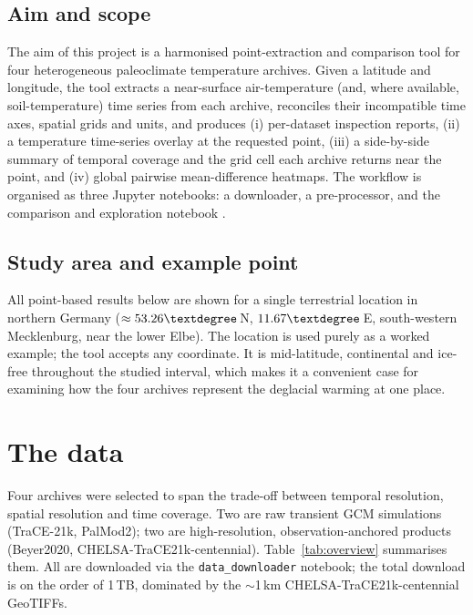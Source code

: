 \documentclass{isprs}
\newcommand{\dg}{\textdegree}
\newcommand{\tabbr}[1]{\texttt{#1}}
\begin{document}
\subsection{Aim and scope}
The aim of this project is a harmonised point-extraction and comparison tool for four heterogeneous paleoclimate temperature archives. Given a latitude and longitude, the tool extracts a near-surface air-temperature (and, where available, soil-temperature) time series from each archive, reconciles their incompatible time axes, spatial grids and units, and produces (i) per-dataset inspection reports, (ii) a temperature time-series overlay at the requested point, (iii) a side-by-side summary of temporal coverage and the grid cell each archive returns near the point, and (iv) global pairwise mean-difference heatmaps. The workflow is organised as three Jupyter notebooks: a downloader, a pre-processor, and the comparison and exploration notebook \cite{giersch2026_paleoclimate_model_comparison}.

\subsection{Study area and example point}
All point-based results below are shown for a single terrestrial location in northern Germany ($\approx 53.26\dg$\,N, $11.67\dg$\,E, south-western Mecklenburg, near the lower Elbe). The location is used purely as a worked example; the tool accepts any coordinate. It is mid-latitude, continental and ice-free throughout the studied interval, which makes it a convenient case for examining how the four archives represent the deglacial warming at one place.

\section{The data}
Four archives were selected to span the trade-off between temporal resolution, spatial resolution and time coverage. Two are raw transient GCM simulations (TraCE-21k, PalMod2); two are high-resolution, observation-anchored products (Beyer2020, CHELSA-TraCE21k-centennial). Table~\ref{tab:overview} summarises them. All are downloaded via the \tabbr{data\_downloader} notebook; the total download is on the order of 1\,TB, dominated by the $\sim$1\,km CHELSA-TraCE21k-centennial GeoTIFFs.
\end{document}

